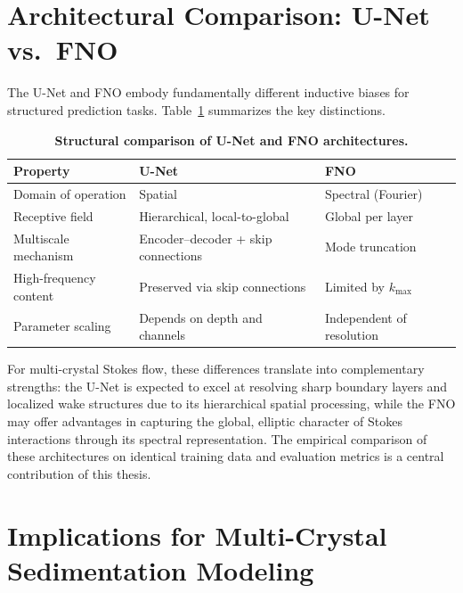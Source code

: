 \section{Architectural Comparison: U-Net vs.\ FNO}
\label{sec:arch_comparison}

The U-Net and FNO embody fundamentally different inductive biases for
structured prediction tasks. Table~\ref{tab:arch_comparison} summarizes the
key distinctions.

\begin{table}[htbp]
\centering
\caption{\textbf{Structural comparison of U-Net and FNO architectures.}}
\label{tab:arch_comparison}
\begin{tabular}{lll}
\toprule
\textbf{Property} & \textbf{U-Net} & \textbf{FNO} \\
\midrule
Domain of operation & Spatial & Spectral (Fourier) \\
Receptive field & Hierarchical, local-to-global & Global per layer \\
Multiscale mechanism & Encoder--decoder + skip connections & Mode truncation \\
High-frequency content & Preserved via skip connections & Limited by $k_{\max}$ \\
Parameter scaling & Depends on depth and channels & Independent of resolution \\
\bottomrule
\end{tabular}
\end{table}

For multi-crystal Stokes flow, these differences translate into complementary
strengths: the U-Net is expected to excel at resolving sharp boundary layers
and localized wake structures due to its hierarchical spatial processing,
while the FNO may offer advantages in capturing the global, elliptic character
of Stokes interactions through its spectral representation. The empirical
comparison of these architectures on identical training data and evaluation
metrics is a central contribution of this thesis.
\newpage
\section{Implications for Multi-Crystal Sedimentation Modeling}
\label{sec:theory_implications}

